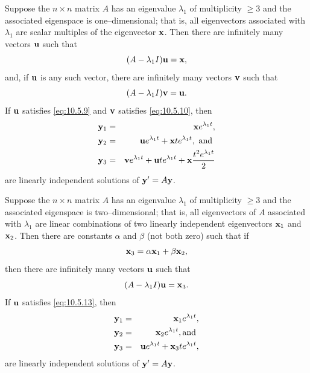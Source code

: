 \setcounter{theorem}{1}
\setcounter{equation}{8}
\begin{theorem}
  \label{thmtype:10.5.2} Suppose the $n\times n$ matrix $A$ has an eigenvalue $\lambda_{1}$ of
  multiplicity $\ge3$ and the associated eigenspace is one--dimensional; that is, all eigenvectors
  associated with $\lambda_{1}$ are scalar multiples of the eigenvector ${\bf x}$. Then there are
  infinitely many vectors ${\bf u}$ such that
  \begin{equation}
    \label{eq:10.5.9}(A-\lambda_{1}I){\bf u}={\bf x},
  \end{equation}
  and, if ${\bf u}$ is any such vector, there are infinitely many vectors ${\bf v}$ such that
  \begin{equation}
    \label{eq:10.5.10}(A-\lambda_{1}I){\bf v}={\bf u}.
  \end{equation}
  If ${\bf u}$ satisfies {\rm\eqref{eq:10.5.9}} and ${\bf v}$ satisfies {\rm\eqref{eq:10.5.10}},
  then
  \begin{eqnarray*}
    {\bf y}_{1} & = & {\bf x}e^{\lambda_{1}t},                                      \\
    {\bf y}_{2} & = & {\bf u}e^{\lambda_{1}t}+{\bf x}te^{\lambda_{1}t},\mbox{ and } \\
    {\bf y}_{3} & = & {\bf v}e^{\lambda_{1}t}+{\bf u}te^{\lambda_{1}t}+{\bf x}{\frac{t^{2}e^{\lambda_{1}t}}{2}}
  \end{eqnarray*}
  are linearly independent solutions of ${\bf y}'=A{\bf y}$.
\end{theorem}

\setcounter{theorem}{2}
\setcounter{equation}{11}
\begin{theorem}
  \label{thmtype:10.5.3} Suppose the $n\times n$ matrix $A$ has an eigenvalue $\lambda_{1}$ of
  multiplicity $\ge3$ and the associated eigenspace is two--dimensional; that is, all eigenvectors
  of $A$ associated with $\lambda_{1}$ are linear combinations of two linearly independent
  eigenvectors ${\bf x}_{1}$ and ${\bf x}_{2}$. Then there are constants $\alpha$ and $\beta$ (not
  both zero) such that if
  \begin{equation}
    \label{eq:10.5.12}{\bf x}_{3}=\alpha{\bf x}_{1}+\beta{\bf x}_{2},
  \end{equation}
  then there are infinitely many vectors ${\bf u}$ such that
  \begin{equation}
    \label{eq:10.5.13}(A-\lambda_{1}I){\bf u}={\bf x}_{3}.
  \end{equation}
  If ${\bf u}$ satisfies {\rm\eqref{eq:10.5.13}}, then
  \begin{eqnarray}
    {\bf y}_{1} & = & {\bf x}_{1}e^{\lambda_{1}t},\nonumber            \\
    {\bf y}_{2} & = & {\bf x}_{2}e^{\lambda_{1}t},\mbox{and }\nonumber \\
    {\bf y}_{3} & = & {\bf u}e^{\lambda_{1}t}+{\bf x}_{3}te^{\lambda_{1}t}\label{eq:10.5.14},
  \end{eqnarray}
  are linearly independent solutions of ${\bf y}'=A{\bf y}$.
\end{theorem}

